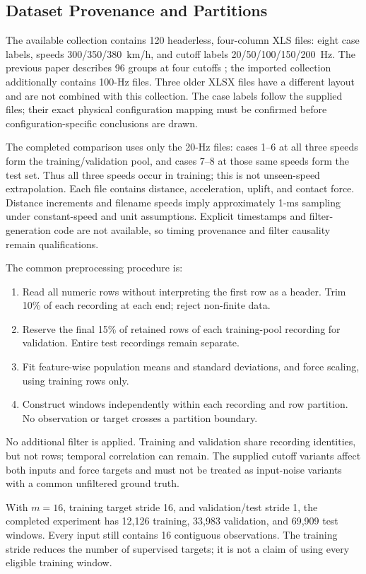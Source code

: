 \documentclass[journal,twoside]{IEEEtran}
\begin{document}
\subsection{Dataset Provenance and Partitions}
The available collection contains 120 headerless, four-column XLS files:
eight case labels, speeds 300/350/380~km/h, and cutoff labels
20/50/100/150/200~Hz. The previous paper describes 96 groups at four cutoffs
\cite{ale2026realtime}; the imported collection additionally contains
100-Hz files. Three older XLSX files have a different layout and are not
combined with this collection. The case labels follow the supplied files;
their exact physical configuration mapping must be confirmed before
configuration-specific conclusions are drawn.

The completed comparison uses only the 20-Hz files: cases 1--6 at all
three speeds form the training/validation pool, and cases 7--8 at those
same speeds form the test set. Thus all three speeds occur in training;
this is not unseen-speed extrapolation. Each file contains distance,
acceleration, uplift, and contact force. Distance increments and filename
speeds imply approximately 1-ms sampling under constant-speed and unit
assumptions. Explicit timestamps and filter-generation code are not
available, so timing provenance and filter causality remain qualifications.

The common preprocessing procedure is:
\begin{enumerate}
    \item Read all numeric rows without interpreting the first row as a
    header. Trim 10\% of each recording at each end; reject non-finite data.
    \item Reserve the final 15\% of retained rows of each training-pool
    recording for validation. Entire test recordings remain separate.
    \item Fit feature-wise population means and standard deviations, and
    force scaling, using training rows only.
    \item Construct windows independently within each recording and row
    partition. No observation or target crosses a partition boundary.
\end{enumerate}
No additional filter is applied. Training and validation share recording
identities, but not rows; temporal correlation can remain. The supplied
cutoff variants affect both inputs and force targets and must not be
treated as input-noise variants with a common unfiltered ground truth.

With $m=16$, training target stride 16, and validation/test stride 1, the
completed experiment has 12,126 training, 33,983 validation, and 69,909 test
windows. Every input still contains 16 contiguous observations. The
training stride reduces the number of supervised targets; it is not a
claim of using every eligible training window.
\end{document}
